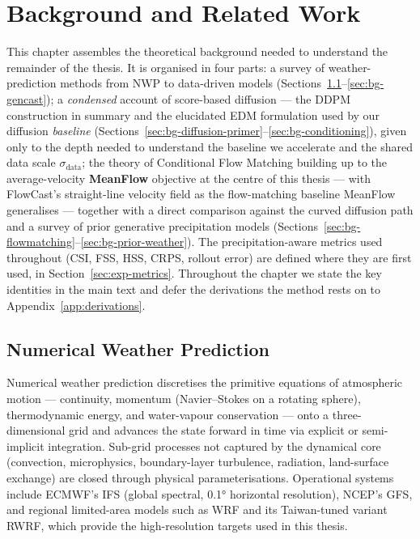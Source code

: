 
\chapter{Background and Related Work}
\label{ch:background}

This chapter assembles the theoretical background needed to understand the remainder of the thesis. It is organised in four parts: a survey of weather-prediction methods from NWP to data-driven models (Sections~\ref{sec:bg-nwp}--\ref{sec:bg-gencast}); a \emph{condensed} account of score-based diffusion --- the DDPM construction in summary and the elucidated EDM formulation used by our diffusion \emph{baseline} (Sections~\ref{sec:bg-diffusion-primer}--\ref{sec:bg-conditioning}), given only to the depth needed to understand the baseline we accelerate and the shared data scale $\sigma_{\text{data}}$; the theory of Conditional Flow Matching building up to the average-velocity \textbf{MeanFlow} objective at the centre of this thesis --- with FlowCast's straight-line velocity field as the flow-matching baseline MeanFlow generalises --- together with a direct comparison against the curved diffusion path and a survey of prior generative precipitation models (Sections~\ref{sec:bg-flowmatching}--\ref{sec:bg-prior-weather}). The precipitation-aware metrics used throughout (CSI, FSS, HSS, CRPS, rollout error) are defined where they are first used, in Section~\ref{sec:exp-metrics}. Throughout the chapter we state the key identities in the main text and defer the derivations the method rests on to Appendix~\ref{app:derivations}.

\section{Numerical Weather Prediction}
\label{sec:bg-nwp}

Numerical weather prediction discretises the primitive equations of atmospheric motion --- continuity, momentum (Navier--Stokes on a rotating sphere), thermodynamic energy, and water-vapour conservation --- onto a three-dimensional grid and advances the state forward in time via explicit or semi-implicit integration. Sub-grid processes not captured by the dynamical core (convection, microphysics, boundary-layer turbulence, radiation, land-surface exchange) are closed through physical parameterisations. Operational systems include ECMWF's IFS (global spectral, \ang{0.1} horizontal resolution), NCEP's GFS, and regional limited-area models such as WRF and its Taiwan-tuned variant RWRF, which provide the high-resolution targets used in this thesis.


